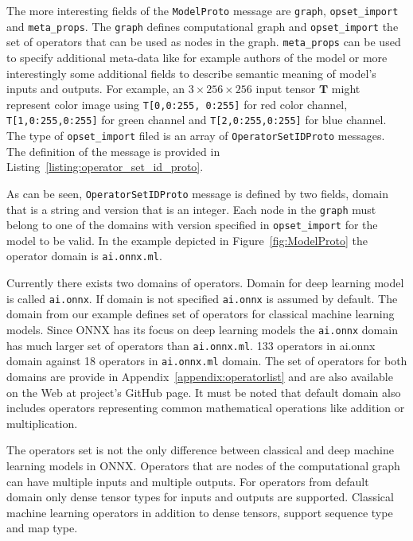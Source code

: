 \documentclass[english, 12pt, a4paper, elec, utf8, online]{aaltothesis}
\begin{document}
The more interesting fields of the \texttt{ModelProto} message are \texttt{graph}, \texttt{opset\_import} and \texttt{meta\_props}. The \texttt{graph} defines computational graph and \texttt{opset\_import} the set of operators that can be used as nodes in the graph. \texttt{meta\_props} can be used to specify additional meta-data like for example authors of the model or more interestingly some additional fields to describe semantic meaning of model's inputs and outputs. For example, an $3 \times 256 \times 256$ input tensor $\mathbf{T}$ might represent color image using \texttt{T[0,0:255, 0:255]} for red color channel, \texttt{T[1,0:255,0:255]} for green channel and \texttt{T[2,0:255,0:255]} for blue channel. The type of \texttt{opset\_import} filed is an array of \texttt{OperatorSetIDProto} messages. The definition of the message is provided in Listing~\ref{listing:operator_set_id_proto}.
\newpage


As can be seen, \texttt{OperatorSetIDProto} message is defined by two fields, domain that is a string and version that is an integer. Each node in the \texttt{graph} must belong to one of the domains with version specified in \texttt{opset\_import} for the model to be valid. In the example depicted in Figure~\ref{fig:ModelProto} the operator domain is \texttt{ai.onnx.ml}. 

Currently there exists two domains of operators. Domain for deep learning model is called \texttt{ai.onnx}. If domain is not specified \texttt{ai.onnx} is assumed by default. The domain from our example defines set of operators for classical machine learning models. Since ONNX has its focus on deep learning models the \texttt{ai.onnx} domain has much larger set of operators than \texttt{ai.onnx.ml}. 133 operators in ai.onnx domain against 18 operators in \texttt{ai.onnx.ml} domain. The set of operators for both domains are provide in Appendix~\ref{appendix:operatorlist} and are also available on the Web at project's GitHub page. It must be noted that default domain also includes operators representing common mathematical operations like addition or multiplication.  

The operators set is not the only difference between classical and deep machine learning models in ONNX.  Operators that are nodes of the computational graph can have multiple inputs and multiple outputs. For operators from default domain only dense tensor types for inputs and outputs are supported. Classical machine learning operators in addition to dense tensors, support sequence type and map type. 
\end{document}
